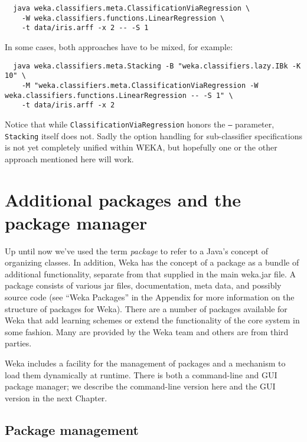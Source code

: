 {\scriptsize
\begin{verbatim}
  java weka.classifiers.meta.ClassificationViaRegression \
    -W weka.classifiers.functions.LinearRegression \
    -t data/iris.arff -x 2 -- -S 1
\end{verbatim}}

\noindent In some cases, both approaches have to be mixed, for example:

{\scriptsize
\begin{verbatim}
  java weka.classifiers.meta.Stacking -B "weka.classifiers.lazy.IBk -K 10" \
    -M "weka.classifiers.meta.ClassificationViaRegression -W weka.classifiers.functions.LinearRegression -- -S 1" \
    -t data/iris.arff -x 2
\end{verbatim}}

\noindent Notice that while \texttt{ClassificationViaRegression} honors the \texttt{--} parameter, \texttt{Stacking} itself does not. Sadly the option handling for sub-classifier specifications is not yet completely unified within WEKA, but hopefully one or the other approach mentioned here will work. 

\section{Additional packages and the package manager}

Up until now we've used the term {\it package} to refer to a Java's
concept of organizing classes. In addition, Weka has the concept of a
package as a bundle of additional functionality, separate from that
supplied in the main weka.jar file. A package consists of various jar
files, documentation, meta data, and possibly source code (see ``Weka
Packages'' in the Appendix for more information on the structure of
packages for Weka). There are a number of packages available for Weka
that add learning schemes or extend the functionality of the core
system in some fashion. Many are provided by the Weka team and others
are from third parties.

Weka includes a facility for the management of packages and a
mechanism to load them dynamically at runtime. There is both a
command-line and GUI package manager; we describe the command-line
version here and the GUI version in the next Chapter.

\subsection{Package management}

